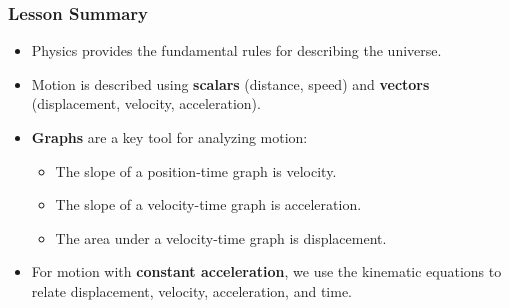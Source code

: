 \documentclass{beamer}
\begin{document}
\begin{frame}
\frametitle{Lesson Summary}
\begin{itemize}
    \item Physics provides the fundamental rules for describing the universe.
    \pause
    \item Motion is described using \textbf{scalars} (distance, speed) and \textbf{vectors} (displacement, velocity, acceleration).
    \pause
    \item \textbf{Graphs} are a key tool for analyzing motion:
    \pause
        \begin{itemize}
            \item The slope of a position-time graph is \alert{velocity}.
            \pause
            \item The slope of a velocity-time graph is \alert{acceleration}.
            \pause
            \item The area under a velocity-time graph is \alert{displacement}.
        \end{itemize}
    \pause
    \item For motion with \textbf{constant acceleration}, we use the kinematic equations to relate displacement, velocity, acceleration, and time.
\end{itemize}
\end{frame}
\end{document}
